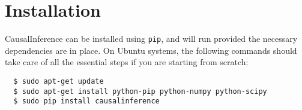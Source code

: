 \documentclass[12pt]{article}
\theoremstyle{definition}
\theoremstyle{definition}
\theoremstyle{definition}
\theoremstyle{remark}
\begin{document}
\section*{Installation}

CausalInference can be installed using \texttt{pip}, and will run provided the necessary dependencies are in place. On Ubuntu systems, the following commands should take care of all the essential steps if you are starting from scratch:
\begin{verbatim}
  $ sudo apt-get update
  $ sudo apt-get install python-pip python-numpy python-scipy
  $ sudo pip install causalinference
\end{verbatim}

\end{document}
